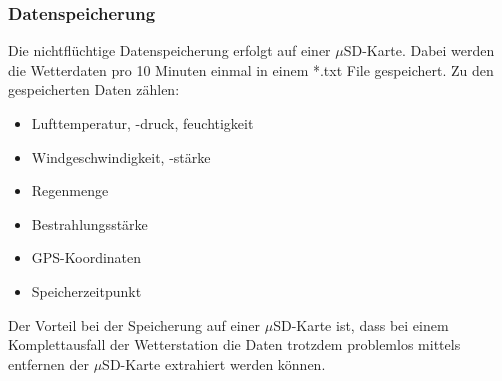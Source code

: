 \subsubsection{Datenspeicherung}
Die nichtflüchtige Datenspeicherung erfolgt auf einer $\mu$SD-Karte. Dabei werden die Wetterdaten pro 10 Minuten einmal in einem *.txt File gespeichert. Zu den gespeicherten Daten zählen:
\begin{itemize}
	\item Lufttemperatur, -druck, feuchtigkeit
	\item Windgeschwindigkeit, -stärke
	\item Regenmenge
	\item Bestrahlungsstärke
	\item GPS-Koordinaten
	\item Speicherzeitpunkt
\end{itemize}
Der Vorteil bei der Speicherung auf einer $\mu$SD-Karte ist, dass bei einem Komplettausfall der Wetterstation die Daten trotzdem problemlos mittels entfernen der $\mu$SD-Karte extrahiert werden können.\\
